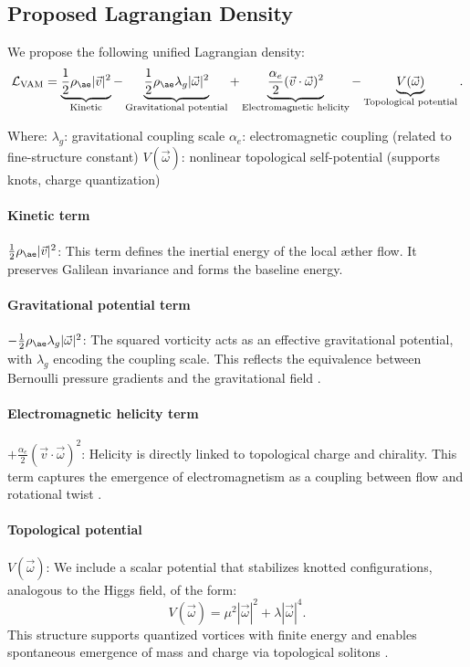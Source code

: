 \subsection{Proposed Lagrangian Density}
We propose the following unified Lagrangian density:
\begin{equation}
\mathcal{L}_{\text{VAM}} =
\underbrace{\frac{1}{2} \rho_{\ae} |\vec{v}|^2}_{\text{Kinetic}}
- \underbrace{\frac{1}{2} \rho_{\ae} \lambda_g |\vec{\omega}|^2}_{\text{Gravitational potential}}
+ \underbrace{\frac{\alpha_e}{2} (\vec{v} \cdot \vec{\omega})^2}_{\text{Electromagnetic helicity}}
- \underbrace{V(\vec{\omega})}_{\text{Topological potential}}.
\end{equation}

Where:
$\lambda_g$: gravitational coupling scale
$\alpha_e$: electromagnetic coupling (related to fine-structure constant)
$V(\vec{\omega})$: nonlinear topological self-potential (supports knots, charge quantization)

\paragraph{Kinetic term} $\frac{1}{2} \rho_{\ae} |\vec{v}|^2$: This term defines the inertial energy of the local \ae{}ther flow. It preserves Galilean invariance and forms the baseline energy.

\paragraph{Gravitational potential term} $-\frac{1}{2} \rho_{\ae} \lambda_g |\vec{\omega}|^2$: The squared vorticity acts as an effective gravitational potential, with $\lambda_g$ encoding the coupling scale. This reflects the equivalence between Bernoulli pressure gradients and the gravitational field \cite{helmholtz1858integrals,batchelor2000introduction}.

\paragraph{Electromagnetic helicity term} $+\frac{\alpha_e}{2} (\vec{v} \cdot \vec{\omega})^2$: Helicity is directly linked to topological charge and chirality. This term captures the emergence of electromagnetism as a coupling between flow and rotational twist \cite{moffatt1969degree,kato1990topological}.

\paragraph{Topological potential} $V(\vec{\omega})$: We include a scalar potential that stabilizes knotted configurations, analogous to the Higgs field, of the form:
\begin{equation}
V(\vec{\omega}) = \mu^2 |\vec{\omega}|^2 + \lambda |\vec{\omega}|^4.
\end{equation}
This structure supports quantized vortices with finite energy and enables spontaneous emergence of mass and charge via topological solitons \cite{ranada1990topological,arrayas2017knots}.

